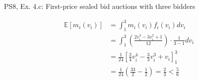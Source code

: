 \begin{frame}{PS8, Ex. 4.c: First-price sealed bid auctions with three bidders}
\begin{multicols}{2}
\begin{itemize}
      \end{itemize}
      \vspace{-12pt}
      \begin{align*}
        \mathbb{E}[m_i(v_i)]&=\textstyle\int_1^3m_i(v_i)f_i(v_i)dv_i\\
                            &=\textstyle\int_1^3\left(\frac{2v_i^3-3v_i^2+1}{12}\right)\cdot\frac{1}{3-1}dv_i\\
                            &=\frac{1}{24}\left[\frac{2}{4}v_i^4-\frac{3}{3}v_i^3+v_i\right]_1^3\\
                            &=\frac{1}{24}\left(\frac{33}{2}-\frac{1}{2}\right)=\frac{2}{3}<\frac{5}{6}
      \end{align*}
      \vfill\null
    \end{multicols}
    \vfill\null
\end{frame}
